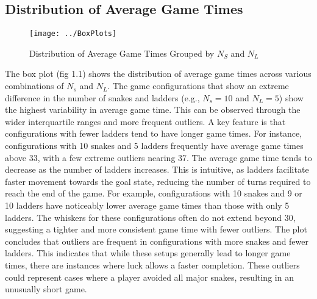 \documentclass[12pt]{report}
\begin{document}
	\subsection{Distribution of Average Game Times}
		\begin{figure}[h]
			\centering
			\texttt{[image: ../BoxPlots]}
			\caption{Distribution of Average Game Times Grouped by $N_{S}$ and $N_{L}$}
			\label{fig:boxplots}
		\end{figure}
	
	The box plot (fig 1.1) shows the distribution of average game times across various combinations of $N_{s}$ and $N_{L}$. The game configurations that show an extreme difference in the number of snakes and ladders (e.g., $N_{s} = 10$ and $N_{L} = 5$) show the highest variability in average game time. This can be observed through the wider interquartile ranges and more frequent outliers. A key feature is that configurations with fewer ladders tend to have longer game times. For instance, configurations with 10 snakes and 5 ladders frequently have average game times above 33, with a few extreme outliers nearing 37. The average game time tends to decrease as the number of ladders increases. This is intuitive, as ladders facilitate faster movement towards the goal state, reducing the number of turns required to reach the end of the game. For example, configurations with 10 snakes and 9 or 10 ladders have noticeably lower average game times than those with only 5 ladders. The whiskers for these configurations often do not extend beyond 30, suggesting a tighter and more consistent game time with fewer outliers. The plot concludes that outliers are frequent in configurations with more snakes and fewer ladders. This indicates that while these setups generally lead to longer game times, there are instances where luck allows a faster completion. These outliers could represent cases where a player avoided all major snakes, resulting in an unusually short game.
	
\end{document}
